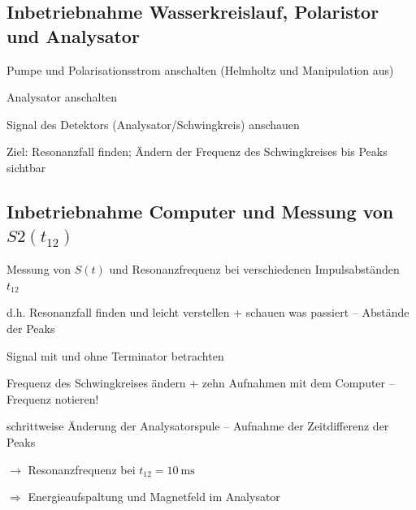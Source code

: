 \documentclass[paper=a4,
	fontsize=10pt,
	DIV=18,
	twocolumn,
	parskip=half
	]{scrartcl}
\numberwithin{equation}{section}    %
\newcommand{\tra}{$\rightarrow $}
\newcommand{\Tra}{$\Rightarrow $}
\begin{document}
\subsection{Inbetriebnahme Wasserkreislauf, Polaristor und Analysator}
\label{vorbereitung2}

\begin{compactitem}
	\item Pumpe und Polarisationsstrom anschalten (Helmholtz und Manipulation aus)
	\item Analysator anschalten
	\item Signal des Detektors (Analysator/Schwingkreis) anschauen
	\item Ziel: Resonanzfall finden; Ändern der Frequenz des Schwingkreises bis Peaks sichtbar
\end{compactitem}

\subsection{Inbetriebnahme Computer und Messung von $S2(t_{12})$}
\label{vorbereitung3}



\begin{compactitem}
	\item Messung von $S(t)$ und Resonanzfrequenz bei verschiedenen Impulsabständen $t_{12}$
	\item[d.h.] Resonanzfall finden und leicht verstellen + schauen was passiert \--- Abstände der Peaks
	\item Signal mit und ohne Terminator betrachten
	\item Frequenz des Schwingkreises ändern + zehn Aufnahmen mit dem Computer \--- Frequenz notieren!
	\item schrittweise Änderung der Analysatorspule \--- Aufnahme der Zeitdifferenz der Peaks
	\item[\tra] Resonanzfrequenz bei $t_{12} = \SI{10}{\milli\second}$
	\item[\Tra] Energieaufspaltung und Magnetfeld im Analysator
\end{compactitem}

\end{document}
